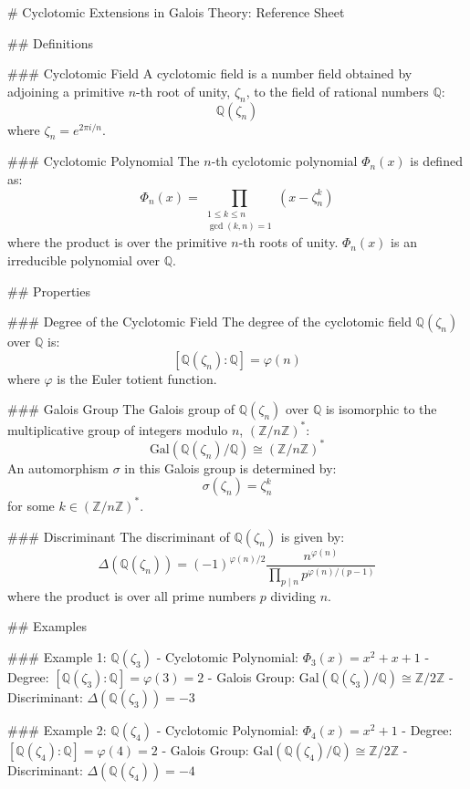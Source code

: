 # Cyclotomic Extensions in Galois Theory: Reference Sheet

## Definitions

### Cyclotomic Field
A cyclotomic field is a number field obtained by adjoining a primitive \( n \)-th root of unity, \(\zeta_n\), to the field of rational numbers \(\mathbb{Q}\):
\[ \mathbb{Q}(\zeta_n) \]
where \(\zeta_n = e^{2\pi i / n}\).

### Cyclotomic Polynomial
The \( n \)-th cyclotomic polynomial \(\Phi_n(x)\) is defined as:
\[ \Phi_n(x) = \prod_{\substack{1 \leq k \leq n \\ \gcd(k, n) = 1}} \left( x - \zeta_n^k \right) \]
where the product is over the primitive \( n \)-th roots of unity. \(\Phi_n(x)\) is an irreducible polynomial over \(\mathbb{Q}\).

## Properties

### Degree of the Cyclotomic Field
The degree of the cyclotomic field \(\mathbb{Q}(\zeta_n)\) over \(\mathbb{Q}\) is:
\[ [\mathbb{Q}(\zeta_n) : \mathbb{Q}] = \varphi(n) \]
where \(\varphi\) is the Euler totient function.

### Galois Group
The Galois group of \(\mathbb{Q}(\zeta_n)\) over \(\mathbb{Q}\) is isomorphic to the multiplicative group of integers modulo \( n \), \((\mathbb{Z}/n\mathbb{Z})^*\):
\[ \text{Gal}(\mathbb{Q}(\zeta_n)/\mathbb{Q}) \cong (\mathbb{Z}/n\mathbb{Z})^* \]
An automorphism \(\sigma\) in this Galois group is determined by:
\[ \sigma(\zeta_n) = \zeta_n^k \]
for some \( k \in (\mathbb{Z}/n\mathbb{Z})^* \).

### Discriminant
The discriminant of \(\mathbb{Q}(\zeta_n)\) is given by:
\[ \Delta(\mathbb{Q}(\zeta_n)) = (-1)^{\varphi(n)/2} \frac{n^{\varphi(n)}}{\prod_{p \mid n} p^{\varphi(n)/(p-1)}} \]
where the product is over all prime numbers \( p \) dividing \( n \).

## Examples

### Example 1: \(\mathbb{Q}(\zeta_3)\)
- Cyclotomic Polynomial: \(\Phi_3(x) = x^2 + x + 1\)
- Degree: \([\mathbb{Q}(\zeta_3) : \mathbb{Q}] = \varphi(3) = 2\)
- Galois Group: \(\text{Gal}(\mathbb{Q}(\zeta_3)/\mathbb{Q}) \cong \mathbb{Z}/2\mathbb{Z}\)
- Discriminant: \(\Delta(\mathbb{Q}(\zeta_3)) = -3\)

### Example 2: \(\mathbb{Q}(\zeta_4)\)
- Cyclotomic Polynomial: \(\Phi_4(x) = x^2 + 1\)
- Degree: \([\mathbb{Q}(\zeta_4) : \mathbb{Q}] = \varphi(4) = 2\)
- Galois Group: \(\text{Gal}(\mathbb{Q}(\zeta_4)/\mathbb{Q}) \cong \mathbb{Z}/2\mathbb{Z}\)
- Discriminant: \(\Delta(\mathbb{Q}(\zeta_4)) = -4\)


